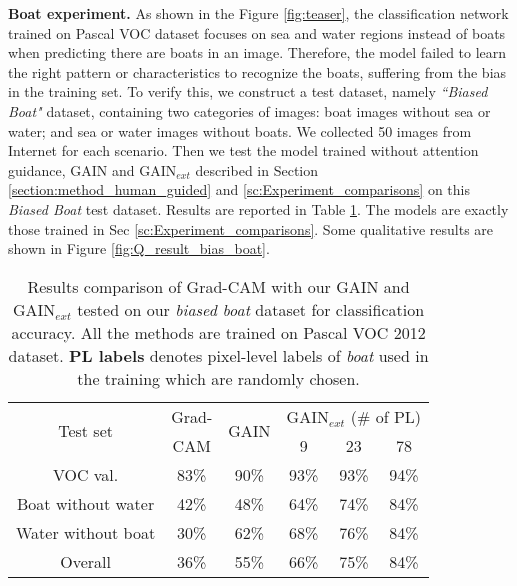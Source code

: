 \documentclass[10pt,twocolumn,letterpaper]{article}
\begin{document}
\textbf{Boat experiment.} As shown in the Figure \ref{fig:teaser}, the classification network trained on Pascal VOC dataset focuses on sea and water regions instead of boats when predicting there are boats in an image. Therefore, the model failed to learn the right pattern or characteristics to recognize the boats, suffering from the bias in the training set. To verify this, we construct a test dataset, namely \textit{``Biased Boat"} dataset, containing two categories of images: boat images without sea or water; and sea or water images without boats. We collected 50 images from Internet for each scenario. Then we test the model trained without attention guidance, GAIN and GAIN$_{ext}$ described in Section \ref{section:method_human_guided} and \ref{sc:Experiment_comparisons} on this \textit{Biased Boat} test dataset. Results are reported in Table \ref{tb:test_bias_results}. The models are exactly those trained in Sec \ref{sc:Experiment_comparisons}. Some qualitative results are shown in Figure \ref{fig:Q_result_bias_boat}. 

\begin{table}
\begin{center}
\begin{tabular}{cccccc}
\hline
\multirow{2}{*}{Test set} & Grad- & \multirow{2}{*}{GAIN} &\multicolumn{3}{c}{GAIN$_{ext}$ (\# of PL)} \\\cline{4-6}
& CAM &  & 9 & 23 & 78 \\\cline{4-6}\hline\hline
VOC val. & 83\% & 90\% & 93\% & 93\% & 94\%\\ \hline
Boat without water & 42\% & 48\% & 64\% & 74\% & 84\%\\ 
Water without boat & 30\% & 62\% & 68\% & 76\% & 84\%\\ 
Overall & 36\% & 55\% & 66\% & 75\% & 84\%\\ 
\hline
\end{tabular}
\end{center}
\caption{Results comparison of Grad-CAM \cite{grad-cam} with our GAIN and GAIN$_{ext}$ tested on our \emph{biased boat} dataset for classification accuracy. All the methods are trained on Pascal VOC 2012 dataset. \textbf{PL labels} denotes pixel-level labels of \emph{boat} used in the training which are randomly chosen. } %
\label{tb:test_bias_results}
\end{table}
\end{document}
